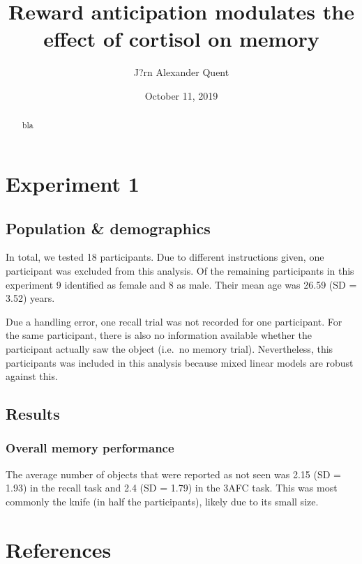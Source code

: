 \documentclass[12pt,]{article}
\title{Reward anticipation modulates the effect of cortisol on memory}
\author{J?rn Alexander Quent}
\date{October 11, 2019}
\begin{document}
\maketitle
\begin{abstract}
bla \newpage
\end{abstract}

{
\setcounter{tocdepth}{3}
\tableofcontents
}
\section{Experiment 1}\label{experiment-1}

\subsection{Population \& demographics}\label{population-demographics}

In total, we tested 18 participants. Due to different instructions
given, one participant was excluded from this analysis. Of the remaining
participants in this experiment 9 identified as female and 8 as male.
Their mean age was 26.59 (SD = 3.52) years.

Due a handling error, one recall trial was not recorded for one
participant. For the same participant, there is also no information
available whether the participant actually saw the object (i.e.~no
memory trial). Nevertheless, this participants was included in this
analysis because mixed linear models are robust against this.

\subsection{Results}\label{results}

\subsubsection{Overall memory
performance}\label{overall-memory-performance}

The average number of objects that were reported as not seen was 2.15
(SD = 1.93) in the recall task and 2.4 (SD = 1.79) in the 3AFC task.
This was most commonly the knife (in half the participants), likely due
to its small size.

\pagebreak

\section{References}\label{references}

\scriptsize
\end{document}
